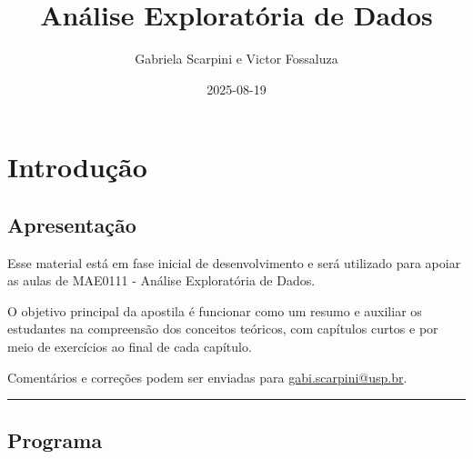 \documentclass[
]{book}
\title{Análise Exploratória de Dados}
\author{Gabriela Scarpini e Victor Fossaluza}
\date{2025-08-19}
\begin{document}
\maketitle

{
\setcounter{tocdepth}{1}
\tableofcontents
}
\chapter{Introdução}\label{intro}

\section{Apresentação}\label{apresentauxe7uxe3o}

Esse material está em fase inicial de desenvolvimento e será utilizado para apoiar as aulas de MAE0111 - Análise Exploratória de Dados.

O objetivo principal da apostila é funcionar como um resumo e auxiliar os estudantes na compreensão dos conceitos teóricos, com capítulos curtos e por meio de exercícios ao final de cada capítulo.

Comentários e correções podem ser enviadas para \url{gabi.scarpini@usp.br}.

\begin{center}\rule{0.5\linewidth}{0.5pt}\end{center}

\section{Programa}\label{programa}
\end{document}

